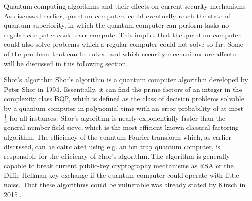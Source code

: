 \documentclass[aps,preprintnumbers,twocolumn]{revtex4}
\begin{document}
\begin{section}{Quantum computing algorithms and their effects on current security mechanisms}
As discussed earlier, quantum computers could eventually reach the state of quantum superiority, 
in which the quantum computer can perform tasks no regular computer could ever compute.
This implies that the quantum computer could also solve problems which a regular computer could not solve so far.
Some of the problems that can be solved and which security mechanisms are affected will be discussed in this following section. 

\begin{subsection}{Shor's algorithm}
Shor's algorithm is a quantum computer algorithm developed by Peter Shor in 1994.
Essentially, it can find the prime factors of an integer in the complexity class BQP,
which is defined as the class of decision problems solvable by a quantum computer in polynomial time with an error probability of at most $\frac{1}{3}$ for all instances. 
Shor's algorithm is nearly exponentially faster than the general number field sieve, which is the most efficient known classical factoring algorithm.
The efficiency of the quantum Fourier transform which, as earlier discussed, can be caluclated using e.g. an ion trap quantum computer, is responsible for the efficiency of Shor's algorithm.
The algorithm is generally capable to break current public-key cryptography mechanisms as RSA or the Diffie-Hellman key exchange if the quantum computer could operate with little noise. 
That these algorithms could be vulnerable was already stated by Kirsch in 2015
\cite[p.6]{Kirsch2015QuantumCT}.


\end{subsection}
\end{section}
\end{document}
